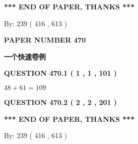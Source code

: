 \documentclass{ctexart}
\begin{document}
   
 \vspace{0.2in}
 
   
   
   
   
\vspace{1.0in} 
{\textbf{\large{ *** END OF PAPER, THANKS *** }}} 
   
   
\hspace{1.0in} By: 
 239 ( 416 ,  613 )
   
   
   
   
\newpage 
\setcounter{page}{ 
   470001 } 
   
   
   
   
 {\textbf{ \Large{ PAPER NUMBER  470  }}}
   
   
\vspace{0.2in}
   
   
   
   
   
   
 \vspace{0.2in}
{\LARGE {\textbf{ 一个快速卷例}}}
   
   
  
\vspace{0.2in}
  
{\textbf{\Large{QUESTION
470.1 
 ( 1 , 1 , 101 )
}}}
  
  
 
 

$ %
48 +  %
61=   %
109$
 
 
  
\vspace{0.2in}
  
{\textbf{\Large{QUESTION
470.2 
 ( 2 , 2 , 201 )
}}}
  
  
   
   
 \vspace{0.2in}
 
   
   
   
   
\vspace{1.0in} 
{\textbf{\large{ *** END OF PAPER, THANKS *** }}} 
   
   
\hspace{1.0in} By: 
 239 ( 416 ,  613 )
   
   
   
   
\newpage 
\setcounter{page}{ 
   471001 } 
   
   
   
\end{document}
